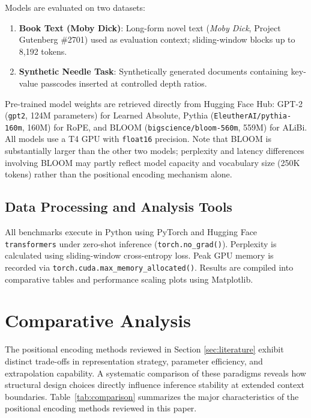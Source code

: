\documentclass[conference]{IEEEtran}
\begin{document}
Models are evaluated on two datasets:
\begin{enumerate}
\item \textbf{Book Text (Moby Dick)}: Long-form novel text (\emph{Moby Dick}, Project Gutenberg \#2701) used as evaluation context; sliding-window blocks up to 8,192 tokens.
\item \textbf{Synthetic Needle Task}: Synthetically generated documents containing key-value passcodes inserted at controlled depth ratios.
\end{enumerate}
Pre-trained model weights are retrieved directly from Hugging Face Hub: GPT-2 (\texttt{gpt2}, 124M parameters) for Learned Absolute, Pythia (\texttt{EleutherAI/pythia-160m}, 160M) for RoPE, and BLOOM (\texttt{bigscience/bloom-560m}, 559M) for ALiBi. All models use a T4 GPU with \texttt{float16} precision. Note that BLOOM is substantially larger than the other two models; perplexity and latency differences involving BLOOM may partly reflect model capacity and vocabulary size (250K tokens) rather than the positional encoding mechanism alone.

\subsection{Data Processing and Analysis Tools}

All benchmarks execute in Python using PyTorch and Hugging Face \texttt{transformers} under zero-shot inference (\texttt{torch.no\_grad()}). Perplexity is calculated using sliding-window cross-entropy loss. Peak GPU memory is recorded via \texttt{torch.cuda.max\_memory\_allocated()}. Results are compiled into comparative tables and performance scaling plots using Matplotlib.

\section{Comparative Analysis}
\label{sec:comparison}

The positional encoding methods reviewed in Section \ref{sec:literature} exhibit distinct trade-offs in representation strategy, parameter efficiency, and extrapolation capability. A systematic comparison of these paradigms reveals how structural design choices directly influence inference stability at extended context boundaries. Table~\ref{tab:comparison} summarizes the major characteristics of the positional encoding methods reviewed in this paper.
\end{document}
